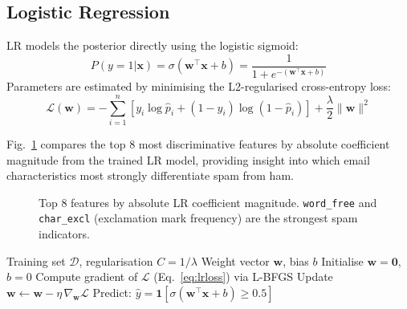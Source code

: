 \documentclass[conference,letterpaper]{IEEEtran}
\begin{document}
\subsection{Logistic Regression}

LR models the posterior directly using the logistic sigmoid:
\begin{equation}
P(y{=}1|\mathbf{x}) = \sigma(\mathbf{w}^{\top}\mathbf{x} + b) = \frac{1}{1+e^{-(\mathbf{w}^{\top}\mathbf{x}+b)}}
\label{eq:lr}
\end{equation}
Parameters are estimated by minimising the L2-regularised cross-entropy loss:
\begin{equation}
\mathcal{L}(\mathbf{w}) = -\sum_{i=1}^{n}\left[y_i\log\hat{p}_i + (1-y_i)\log(1-\hat{p}_i)\right] + \frac{\lambda}{2}\|\mathbf{w}\|^2
\label{eq:lrloss}
\end{equation}

Fig.~\ref{fig:featbar} compares the top 8 most discriminative features by absolute coefficient
magnitude from the trained LR model, providing insight into which email characteristics most
strongly differentiate spam from ham.

\begin{figure}[!t]
\centering
{}
\caption{Top 8 features by absolute LR coefficient magnitude. \texttt{word\_free} and
\texttt{char\_excl} (exclamation mark frequency) are the strongest spam indicators.}
\label{fig:featbar}
\end{figure}

\begin{algorithm}[!t]
\caption{Logistic Regression (L2)}
\label{alg:lr}
\begin{algorithmic}[1]
\REQUIRE Training set $\mathcal{D}$, regularisation $C=1/\lambda$
\ENSURE Weight vector $\mathbf{w}$, bias $b$
\STATE Initialise $\mathbf{w}=\mathbf{0}$, $b=0$
\REPEAT
  \STATE Compute gradient of $\mathcal{L}$ (Eq.~\ref{eq:lrloss}) via L-BFGS
  \STATE Update $\mathbf{w} \leftarrow \mathbf{w} - \eta\,\nabla_{\mathbf{w}}\mathcal{L}$
\STATE Predict: $\hat{y} = \mathbf{1}[\sigma(\mathbf{w}^{\top}\mathbf{x}+b)\geq 0.5]$
\end{algorithmic}
\end{algorithm}
\end{document}
